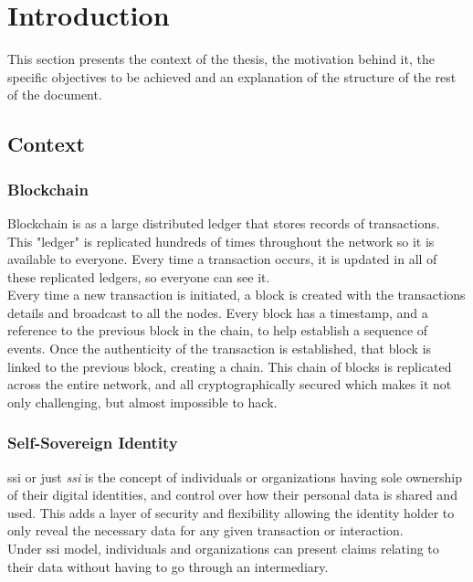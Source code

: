 \section{Introduction}

This section presents the context of the thesis, the motivation behind it, the specific objectives to be achieved and an explanation of the structure of the rest of the document.

\subsection{Context}
\subsubsection{Blockchain}
Blockchain\cite{blockchain-sum,blockchainGartner} is as a large distributed ledger that stores records of transactions. This "ledger" is replicated hundreds of times throughout the network so it is available to everyone. Every time a transaction occurs, it is updated in all of these replicated ledgers, so everyone can see it.\\

Every time a new transaction is initiated, a block is created with the transactions details and broadcast to all the nodes. Every block has a timestamp, and a reference to the previous block in the chain, to help establish a sequence of events. Once the authenticity of the transaction is established, that block is linked to the previous block, creating a chain. This chain of blocks is replicated across the entire network, and all cryptographically secured which makes it not only challenging, but almost impossible to hack.

\subsubsection{Self-Sovereign Identity}
\acrlong{ssi} or just \textit{\acrshort{ssi}}\cite{ssi} is the concept of individuals or organizations having sole ownership of their digital identities, and control over how their personal data is shared and used. This adds a layer of security and flexibility allowing the identity holder to only reveal the necessary data for any given transaction or interaction.\\

Under \acrlong{ssi} model, individuals and organizations can present claims relating to their data without having to go through an intermediary.\\

